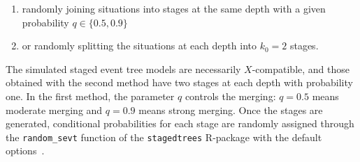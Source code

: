 \documentclass[preprint,12pt]{elsarticle}
\newcommand{\blue}{\color{blue}}
\begin{document}
\begin{enumerate}
    \item randomly joining situations into stages at the same depth with a given probability $q \in \{0.5, 0.9\}$    
    \item or randomly splitting the situations at each depth into $k_0 = 2$ stages. 
\end{enumerate}

 
The simulated staged event tree models are necessarily $X$-compatible, and those obtained with the second method have two stages at each depth with probability one. In the first method, the parameter $q$ controls the merging: $q = 0.5$ means moderate merging and $q = 0.9$ means strong merging. Once the  stages are generated,
conditional probabilities for each stage are randomly 
assigned through the \texttt{random\_sevt} function of the \texttt{stagedtrees} R-package with the default options~\cite{JSSv102i06}.

\end{document}
